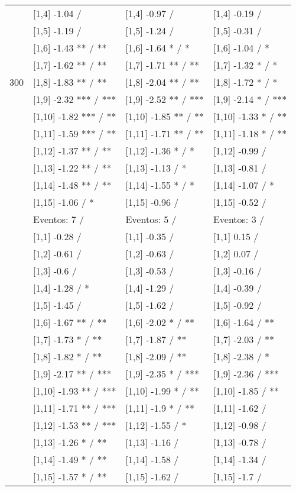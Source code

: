 \begin{table}
\begin{tabular}[t]{llll}
 & {}[1,4] -1.04  / & {}[1,4] -0.97  / & {}[1,4] -0.19  /\\
 & {}[1,5] -1.19  / & {}[1,5] -1.24  / & {}[1,5] -0.31  /\\
 & {}[1,6] -1.43 ** / ** & {}[1,6] -1.64 * / * & {}[1,6] -1.04  / *\\
 & {}[1,7] -1.62 ** / ** & {}[1,7] -1.71 ** / ** & {}[1,7] -1.32 * / *\\
300 & {}[1,8] -1.83 ** / ** & {}[1,8] -2.04 ** / ** & {}[1,8] -1.72 * / *\\
\addlinespace
 & {}[1,9] -2.32 *** / *** & {}[1,9] -2.52 ** / *** & {}[1,9] -2.14 * / ***\\
 & {}[1,10] -1.82 *** / ** & {}[1,10] -1.85 ** / ** & {}[1,10] -1.33 * / **\\
 & {}[1,11] -1.59 *** / ** & {}[1,11] -1.71 ** / ** & {}[1,11] -1.18 * / **\\
 & {}[1,12] -1.37 ** / ** & {}[1,12] -1.36 * / * & {}[1,12] -0.99  /\\
 & {}[1,13] -1.22 ** / ** & {}[1,13] -1.13  / * & {}[1,13] -0.81  /\\
\addlinespace
 & {}[1,14] -1.48 ** / ** & {}[1,14] -1.55 * / * & {}[1,14] -1.07  / *\\
 & {}[1,15] -1.06  / * & {}[1,15] -0.96  / & {}[1,15] -0.52  /\\
 & Eventos:  7 / & Eventos:  5 / & Eventos:  3 /\\
 & {}[1,1] -0.28  / & {}[1,1] -0.35  / & {}[1,1] 0.15  /\\
 & {}[1,2] -0.61  / & {}[1,2] -0.63  / & {}[1,2] 0.07  /\\
\addlinespace
 & {}[1,3] -0.6  / & {}[1,3] -0.53  / & {}[1,3] -0.16  /\\
 & {}[1,4] -1.28  / * & {}[1,4] -1.29  / & {}[1,4] -0.39  /\\
 & {}[1,5] -1.45  / & {}[1,5] -1.62  / & {}[1,5] -0.92  /\\
 & {}[1,6] -1.67 ** / ** & {}[1,6] -2.02 * / ** & {}[1,6] -1.64  / **\\
 & {}[1,7] -1.73 * / ** & {}[1,7] -1.87  / ** & {}[1,7] -2.03  / **\\
\addlinespace
500 & {}[1,8] -1.82 * / ** & {}[1,8] -2.09  / ** & {}[1,8] -2.38  / *\\
 & {}[1,9] -2.17 ** / *** & {}[1,9] -2.35 * / *** & {}[1,9] -2.36  / ***\\
 & {}[1,10] -1.93 ** / *** & {}[1,10] -1.99 * / ** & {}[1,10] -1.85  / **\\
 & {}[1,11] -1.71 ** / *** & {}[1,11] -1.9 * / ** & {}[1,11] -1.62  /\\
 & {}[1,12] -1.53 ** / *** & {}[1,12] -1.55  / * & {}[1,12] -0.98  /\\
\addlinespace
 & {}[1,13] -1.26 * / ** & {}[1,13] -1.16  / & {}[1,13] -0.78  /\\
 & {}[1,14] -1.49 * / ** & {}[1,14] -1.58  / & {}[1,14] -1.34  /\\
 & {}[1,15] -1.57 * / ** & {}[1,15] -1.62  / & {}[1,15] -1.7  /\\
\bottomrule
\end{tabular}
\end{table}
